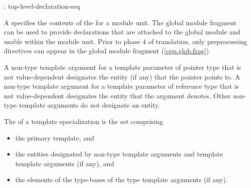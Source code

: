 \begin{std.txt}\color{addclr}
\begin{bnf}
:\br
     \terminal{;} top-level-declaration-seq\opt
\end{bnf}

\pnum
A  specifies the contents of the
 for a module unit.
The global module fragment can be used to provide declarations
that are attached to the global module and usable within the module unit.
\enternote
Prior to phase 4 of translation,
only preprocessing directives can appear
in the global module fragment (\ref{cpp.glob.frag}).
\exitnote


\pnum
A non-type template argument for a template parameter of pointer type
that is not value-dependent designates the entity (if any) that the
pointer points to.
A non-type template argument for a template parameter of reference type
that is not value-dependent designates the entity that the argument
denotes.
Other non-type template arguments do not designate an entity.

\pnum
The  of a template specialization is
the set comprising
\begin{itemize}
\item the primary template, and
\item the entities designated by
non-type template arguments and
template template arguments (if any), and
\item the elements of the type-bases
of the type template arguments (if any).
\end{itemize}


\end{std.txt}
